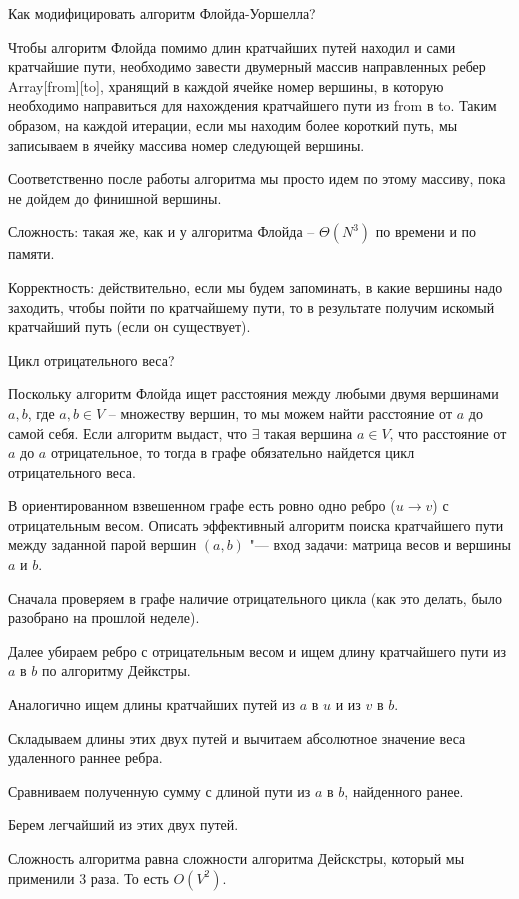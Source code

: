 \documentclass[12pt]{extreport}
\theoremstyle{definiton}
\theoremstyle{definition}
\theoremstyle{definition}
\newcounter{problem}
\newcounter{subproblem}
\def\beforPRskip{
	\bigskip
}
\def\pr{\beforPRskip\noindent\stepcounter{problem}{\bf \theproblem .\;}\setcounter{subproblem}{0}}
\begin{document}
	

\pr Как модифицировать алгоритм Флойда-Уоршелла?

	Чтобы алгоритм Флойда помимо длин кратчайших путей находил и сами кратчайшие пути, необходимо завести двумерный массив направленных ребер Array[from][to], хранящий в каждой ячейке номер вершины,
	в которую необходимо направиться для нахождения кратчайшего пути из from в to.
	Таким образом, на каждой итерации, если мы находим более короткий путь, мы записываем в ячейку массива номер следующей вершины.

	Соответственно после работы алгоритма мы просто идем по этому массиву, пока не дойдем до финишной вершины.

	Сложность: такая же, как и у алгоритма Флойда -- $\Theta(N^3)$ по времени и по памяти.

	Корректность: действительно, если мы будем запоминать, в какие вершины надо заходить, чтобы пойти по кратчайшему пути, то в результате получим искомый кратчайший путь (если он существует).

\pr Цикл отрицательного веса?

	Поскольку алгоритм Флойда ищет расстояния между любыми двумя вершинами $a, b$, где $a, b \in V$ -- множеству вершин, то мы можем найти
	расстояние от $a$ до самой себя. Если алгоритм выдаст, что $\exists$ такая вершина $a \in V$, что расстояние от $a$ до $a$ отрицательное,
	то тогда в графе обязательно найдется цикл отрицательного веса.

\pr В ориентированном взвешенном графе есть ровно одно ребро ($u \to v$) с отрицательным весом. Описать эффективный алгоритм поиска кратчайшего пути между заданной парой вершин $(a,b)$ "--- вход задачи: матрица весов и вершины $a$ и $b$.

	Сначала проверяем в графе наличие отрицательного цикла (как это делать, было разобрано на прошлой неделе).

	Далее убираем ребро с отрицательным весом и ищем длину кратчайшего пути из $a$ в $b$ по алгоритму Дейкстры.

	Аналогично ищем длины кратчайших путей из $a$ в $u$ и из $v$ в $b$.

	Складываем длины этих двух путей и вычитаем абсолютное значение веса удаленного раннее ребра.

	Сравниваем полученную сумму с длиной пути из $a$ в $b$, найденного ранее.

	Берем легчайший из этих двух путей.

	Сложность алгоритма равна сложности алгоритма Дейскстры, который мы применили 3 раза. То есть $O(V^2)$.
\end{document}
